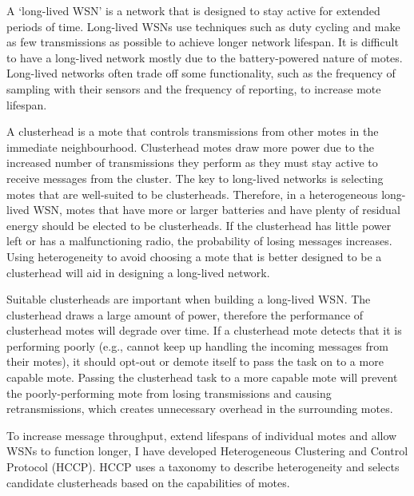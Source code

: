 
A `long-lived WSN' is a network that is designed to stay active for extended 
periods of time. Long-lived WSNs use techniques such as duty cycling and make 
as few transmissions as possible to achieve longer network lifespan. It is 
difficult to have a long-lived network mostly due to the battery-powered 
nature of motes. Long-lived networks often trade off some functionality, such 
as the frequency of sampling with their sensors and the frequency of 
reporting,  to increase mote lifespan.

A clusterhead is a mote that controls transmissions from other 
motes in the immediate neighbourhood. Clusterhead motes draw more power due to 
the increased number of transmissions they perform as they must stay active to receive messages 
from the cluster. 
The key to long-lived networks is selecting motes that are well-suited to be clusterheads.  
Therefore, in a 
heterogeneous long-lived WSN, motes that have more or larger batteries and have plenty 
of residual energy should be elected to be clusterheads. If the 
clusterhead has little power left or has a malfunctioning radio, the 
probability of losing messages increases. Using heterogeneity to avoid 
choosing a mote that is better designed to be a clusterhead will aid in 
designing a long-lived network.

Suitable clusterheads are important when building a long-lived WSN. The 
clusterhead draws a large amount of power, therefore  the performance of 
clusterhead motes will degrade over time. If a clusterhead mote detects that 
it is performing poorly (e.g., cannot keep up handling the incoming messages 
from their motes), it should opt-out or demote itself to pass the task on to a 
more capable mote. Passing the clusterhead task to a more capable mote will 
prevent the poorly-performing mote from losing transmissions and causing 
retransmissions, which creates unnecessary overhead in the surrounding motes.

To increase message throughput, extend lifespans of individual motes and allow WSNs to function longer, I 
have developed Heterogeneous Clustering and Control Protocol (HCCP). HCCP 
uses a taxonomy to describe heterogeneity and selects candidate clusterheads 
based on the capabilities of motes.



